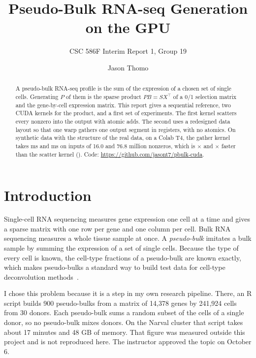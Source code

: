 \documentclass[sigconf,nonacm]{acmart}
\begin{document}
\title{Pseudo-Bulk RNA-seq Generation on the GPU}
\subtitle{CSC 586F Interim Report 1, Group 19}
\author{Jason Thomo}

\begin{abstract}
A pseudo-bulk RNA-seq profile is the sum of the expression of a chosen set of single cells.
Generating $P$ of them is the sparse product $PB = S X^{\top}$ of a 0/1 selection matrix and the
gene-by-cell expression matrix. This report gives a sequential reference, two CUDA kernels for the
product, and a first set of experiments. The first kernel scatters every nonzero into the output
with atomic adds. The second uses a redesigned data layout so that one warp gathers one output
segment in registers, with no atomics. On synthetic data with the structure of the real data, on a
Colab T4,
the gather kernel takes \GatherMsMedium{} ms and \GatherMsLarge{} ms on inputs of 16.0 and 76.8
million nonzeros, which is \AblationMedium{}$\times$ and \AblationLarge{}$\times$ faster than the
scatter kernel (\ResShort{}). Code: \url{https://github.com/jasont7/pbulk-cuda}.
\end{abstract}

\maketitle

\section{Introduction}

Single-cell RNA sequencing measures gene expression one cell at a time and gives a sparse matrix
with one row per gene and one column per cell. Bulk RNA sequencing measures a whole tissue sample at
once. A \emph{pseudo-bulk} imitates a bulk sample by summing the expression of a set of single
cells. Because the type of every cell is known, the cell-type fractions of a pseudo-bulk are known
exactly, which makes pseudo-bulks a standard way to build test data for cell-type deconvolution
methods~\cite{avilacobos2020}.

I chose this problem because it is a step in my own research pipeline. There, an R script builds 900
pseudo-bulks from a matrix of 14,378 genes by 241,924 cells from 30 donors. Each pseudo-bulk sums a
random subset of the cells of a single donor, so no pseudo-bulk mixes donors. On the Narval cluster
that script takes about 17 minutes and 48 GB of memory. That figure was measured outside this
project and is not reproduced here. The instructor approved the topic on October 6.
\end{document}

